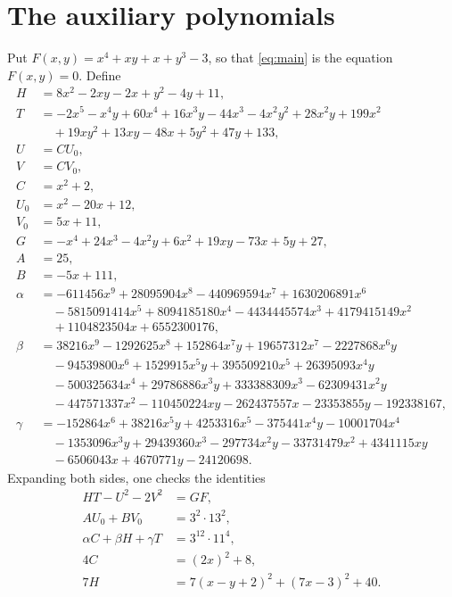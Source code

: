 \documentclass[11pt]{article}
\begin{document}
\section{The auxiliary polynomials}

Put $F(x,y)=x^{4}+xy+x+y^{3}-3$, so that \eqref{eq:main} is the equation $F(x,y)=0$. Define
\begin{align*}
H&=8x^{2}-2xy-2x+y^{2}-4y+11,\\
T&=-2x^{5}-x^{4}y+60x^{4}+16x^{3}y-44x^{3}-4x^{2}y^{2}+28x^{2}y+199x^{2}\\
&\quad+19xy^{2}+13xy-48x+5y^{2}+47y+133,\\
U&=CU_0,\\
V&=CV_0,\\
C&=x^{2}+2,\\
U_0&=x^{2}-20x+12,\\
V_0&=5x+11,\\
G&=-x^{4}+24x^{3}-4x^{2}y+6x^{2}+19xy-73x+5y+27,\\
A&=25,\\
B&=-5x+111,\\
\alpha&=-611456x^{9}+28095904x^{8}-440969594x^{7}+1630206891x^{6}\\
&\quad-5815091414x^{5}+8094185180x^{4}-4434445574x^{3}+4179415149x^{2}\\
&\quad+1104823504x+6552300176,\\
\beta&=38216x^{9}-1292625x^{8}+152864x^{7}y+19657312x^{7}-2227868x^{6}y\\
&\quad-94539800x^{6}+1529915x^{5}y+395509210x^{5}+26395093x^{4}y\\
&\quad-500325634x^{4}+29786886x^{3}y+333388309x^{3}-62309431x^{2}y\\
&\quad-447571337x^{2}-110450224xy-262437557x-23353855y-192338167,\\
\gamma&=-152864x^{6}+38216x^{5}y+4253316x^{5}-375441x^{4}y-10001704x^{4}\\
&\quad-1353096x^{3}y+29439360x^{3}-297734x^{2}y-33731479x^{2}+4341115xy\\
&\quad-6506043x+4670771y-24120698.
\end{align*}
Expanding both sides, one checks the identities
\begin{align}
HT-U^2-2V^2&=GF,\label{eq:norm}\\
AU_0+BV_0&=3^{2}\cdot 13^{2},\label{eq:bezout}\\
\alpha C+\beta H+\gamma T&=3^{12}\cdot 11^{4},\label{eq:bezoutC}\\
4C&=(2x)^2+8,\label{eq:Cpos}\\
7H&=7(x-y+2)^2+(7x-3)^2+40.\label{eq:sign}
\end{align}
\end{document}
